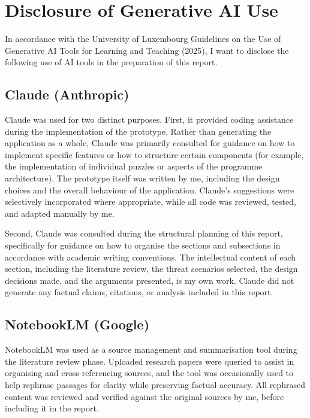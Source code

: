 \documentclass[sigconf, authorversion=true, nonacm=true]{acmart}%
\begin{document}
\appendix

\section{Disclosure of Generative AI Use}

In accordance with the University of Luxembourg Guidelines on the Use  of Generative AI Tools for Learning and Teaching (2025), I want to disclose the following use of AI tools in the preparation of this report.

\subsection*{Claude (Anthropic)}

Claude was used for two distinct purposes. First, it provided coding assistance during the implementation of the prototype. Rather than generating the application as a whole, Claude was primarily consulted for guidance on how to implement specific features or how to structure certain components (for example, the implementation of individual puzzles or aspects of the programme architecture). The prototype itself was written by me, including the design choices and the overall behaviour of the application. Claude's suggestions were selectively incorporated where appropriate, while all code was reviewed, tested, and adapted manually by me.

Second, Claude was consulted during the structural planning of this report, specifically for guidance on how to organise the sections and subsections in accordance with academic writing conventions. The intellectual content of each section, including the literature review, the threat scenarios selected, the design decisions made, and the arguments presented, is my own work. Claude did not generate any factual claims, citations, or analysis included in this report.

\subsection*{NotebookLM (Google)}

NotebookLM was used as a source management and summarisation tool during the literature review phase. Uploaded research papers were queried to assist in organising and cross-referencing sources, and the tool was occasionally used to help rephrase passages for clarity while preserving factual accuracy. All rephrased content was reviewed and verified against the original sources by me, before including it in the report.
\end{document}
